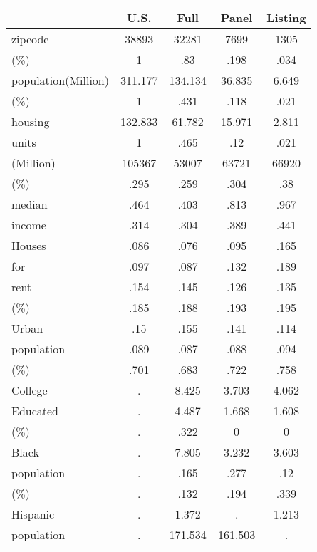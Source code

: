 \begin{table}[htbp]
\begin{tabular}{lcccc} \hline \hline
 & U.S.  & Full  & Panel  & Listing  \\  \hline 
zipcode & 38893 & 32281 & 7699 & 1305 \\  
(\%) & 1 & .83 & .198 & .034 \\  
population(Million) & 311.177 & 134.134 & 36.835 & 6.649 \\  
(\%) & 1 & .431 & .118 & .021 \\  
housing & 132.833 & 61.782 & 15.971 & 2.811 \\  
units & 1 & .465 & .12 & .021 \\  
(Million) & 105367 & 53007 & 63721 & 66920 \\  
(\%) & .295 & .259 & .304 & .38 \\  
median & .464 & .403 & .813 & .967 \\  
income & .314 & .304 & .389 & .441 \\  
Houses & .086 & .076 & .095 & .165 \\  
for & .097 & .087 & .132 & .189 \\  
rent & .154 & .145 & .126 & .135 \\  
(\%) & .185 & .188 & .193 & .195 \\  
Urban & .15 & .155 & .141 & .114 \\  
population & .089 & .087 & .088 & .094 \\  
(\%) & .701 & .683 & .722 & .758 \\  
College & . & 8.425 & 3.703 & 4.062 \\  
Educated & . & 4.487 & 1.668 & 1.608 \\  
(\%) & . & .322 & 0 & 0 \\  
Black & . & 7.805 & 3.232 & 3.603 \\  
population & . & .165 & .277 & .12 \\  
(\%) & . & .132 & .194 & .339 \\  
Hispanic & . & 1.372 & . & 1.213 \\  
population & . & 171.534 & 161.503 & . \\  
\hline \hline \end{tabular}
\end{table}
